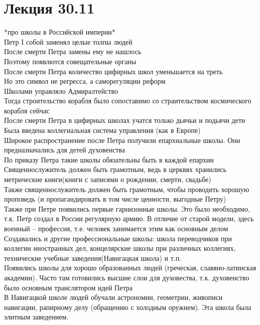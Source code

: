 \documentclass[12pt]{article}
\begin{document}
\section{Лекция 30.11}
*про школы в Российской империи*\\
Петр I собой заменял целые толпы людей\\
После смерти Петра замены ему не нашлось\\
Поэтому появлются совещательные органы\\
После смерти Петра количество цифирных школ уменьшается на треть\\
Но это символ не регресса, а саморегуляции реформ\\
Школами управляло Адмиралтейство\\
Тогда строительство корабля было сопоставимо со страительством космического корабля сейчас\\
После смерти Петра в цифирных школах учатся только дьячьи и подьячи дети\\
Была введена коллегиальная система управления (как в Европе)\\
Широкое распространение после Петра получили епархиальные школы. Они предназначались для детей духовенства\\
По приказу Петра такие школы обязательны быть в каждой епархии\\
Священнослужитель должен быть грамотным, ведь в церквях хранились метрические книги(книги с записями о рождении, смерти, свадьбе)\\
Также священнослужитель должен быть грамотным, чтобы проводить хорошую проповедь (и пропагандировать в том числе ценности, выгодные Петру)\\
Также при Петре появились первые гарнизонные школы. Это было необходимо, т.к. Петр создал в России регулярную армию. В отличие от старой модели, здесь военный -- профессия, т.е. человек занимается этим как основным делом\\
Создавались и другие профессиональные школы: школа переводчиков при коллегии иностранных дел, концелярские школы при различных коллегиях, технические учебные заведения(Навигацкая школа) и т.п.\\
Появились школы для хорошо образованных людей (греческая, славяно-латинская академии). Часто там готовились высшие слои для духовества, т.к. духовенство было основным транслятором идей Петра\\
В Навигацкой школе людей обучали астрономии, геометрии, живописи навигации, рапирному делу (обращению с холодным оружием). Эта школа была элитным заведением.\\
\end{document}
